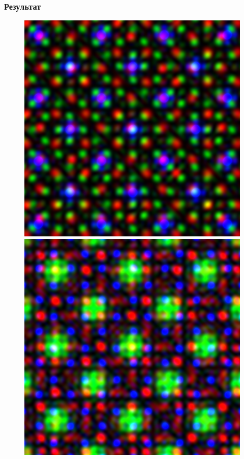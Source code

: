 \documentclass{beamer}
\begin{document}
\begin{frame}
  \frametitle{Результат}

  \begin{figure}[c]
    \includegraphics[scale=0.3]{assets/diffR1.png}
    \includegraphics[scale=0.3]{assets/diffR2.png}
  \end{figure}
\end{frame}
\end{document}
